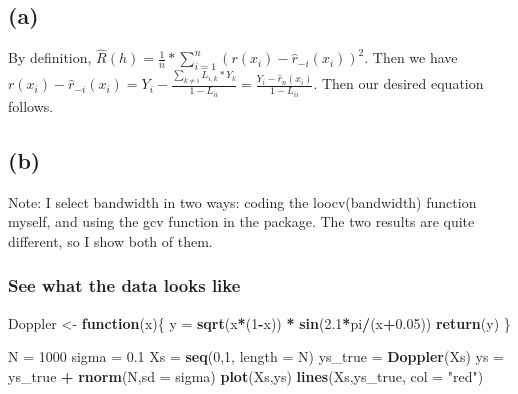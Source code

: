 \documentclass[]{article}
\newenvironment{Shaded}{\begin{snugshade}}{\end{snugshade}}
\newcommand{\KeywordTok}[1]{\textcolor[rgb]{0.13,0.29,0.53}{\textbf{#1}}}
\newcommand{\DataTypeTok}[1]{\textcolor[rgb]{0.13,0.29,0.53}{#1}}
\newcommand{\DecValTok}[1]{\textcolor[rgb]{0.00,0.00,0.81}{#1}}
\newcommand{\FloatTok}[1]{\textcolor[rgb]{0.00,0.00,0.81}{#1}}
\newcommand{\StringTok}[1]{\textcolor[rgb]{0.31,0.60,0.02}{#1}}
\newcommand{\ControlFlowTok}[1]{\textcolor[rgb]{0.13,0.29,0.53}{\textbf{#1}}}
\newcommand{\OperatorTok}[1]{\textcolor[rgb]{0.81,0.36,0.00}{\textbf{#1}}}
\newcommand{\NormalTok}[1]{#1}
\begin{document}
\subsection{(a)}\label{a-1}

By definition,
\(\hat{R}(h) = \frac{1}{n} * \sum_{i = 1}^{n} (r(x_{i})-\hat{r}_{-i}(x_{i}))^2\).
Then we have
\(r(x_{i}) - \hat{r}_{-i}(x_{i}) = Y_{i} - \frac{\sum_{k \neq i} L_{i,k} * Y_{k}}{1-L_{ii}} = \frac{Y_{i} - \hat{r}_{n}(x_{i})} {1-L _{ii}}\).
Then our desired equation follows.

\subsection{(b)}\label{b-1}

Note: I select bandwidth in two ways: coding the loocv(bandwidth)
function myself, and using the gcv function in the package. The two
results are quite different, so I show both of them.

\subsubsection{See what the data looks
like}\label{see-what-the-data-looks-like}

\begin{Shaded}
\begin{Highlighting}[]
\NormalTok{Doppler <-}\StringTok{ }\ControlFlowTok{function}\NormalTok{(x)\{}
\NormalTok{  y =}\StringTok{ }\KeywordTok{sqrt}\NormalTok{(x}\OperatorTok{*}\NormalTok{(}\DecValTok{1}\OperatorTok{-}\NormalTok{x)) }\OperatorTok{*}\StringTok{ }\KeywordTok{sin}\NormalTok{(}\FloatTok{2.1}\OperatorTok{*}\NormalTok{pi}\OperatorTok{/}\NormalTok{(x}\OperatorTok{+}\FloatTok{0.05}\NormalTok{)) }
  \KeywordTok{return}\NormalTok{(y)}
\NormalTok{\}}

\NormalTok{N =}\StringTok{ }\DecValTok{1000}
\NormalTok{sigma =}\StringTok{ }\FloatTok{0.1}
\NormalTok{Xs =}\StringTok{ }\KeywordTok{seq}\NormalTok{(}\DecValTok{0}\NormalTok{,}\DecValTok{1}\NormalTok{, }\DataTypeTok{length =}\NormalTok{ N)}
\NormalTok{ys_true =}\StringTok{ }\KeywordTok{Doppler}\NormalTok{(Xs)}
\NormalTok{ys =}\StringTok{ }\NormalTok{ys_true }\OperatorTok{+}\StringTok{ }\KeywordTok{rnorm}\NormalTok{(N,}\DataTypeTok{sd =}\NormalTok{ sigma)}
\KeywordTok{plot}\NormalTok{(Xs,ys)}
\KeywordTok{lines}\NormalTok{(Xs,ys_true, }\DataTypeTok{col =} \StringTok{"red"}\NormalTok{)}
\end{Highlighting}
\end{Shaded}
\end{document}

